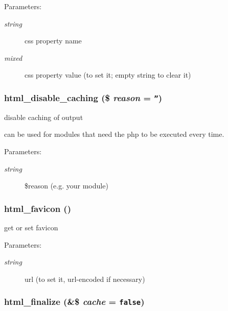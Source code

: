 \begin{Desc}
\item[Parameters:]
\begin{description}
\item[{\em string}]css property name \item[{\em mixed}]css property value (to set it; empty string to clear it) \end{description}
\end{Desc}
\hypertarget{html_8inc_8php_b0dafe79ee61164014b0a4d8b4112dbb}{
\subsubsection[{html\_\-disable\_\-caching}]{\setlength{\rightskip}{0pt plus 5cm}html\_\-disable\_\-caching (\$ {\em reason} = {\tt ''})}}
\label{html_8inc_8php_b0dafe79ee61164014b0a4d8b4112dbb}


disable caching of output

can be used for modules that need the php to be executed every time. \begin{Desc}
\item[Parameters:]
\begin{description}
\item[{\em string}]\$reason (e.g. your module) \end{description}
\end{Desc}
\hypertarget{html_8inc_8php_5738adf9b56d1ff2b8d02977ed7929ce}{
\subsubsection[{html\_\-favicon}]{\setlength{\rightskip}{0pt plus 5cm}html\_\-favicon ()}}
\label{html_8inc_8php_5738adf9b56d1ff2b8d02977ed7929ce}


get or set favicon

\begin{Desc}
\item[Parameters:]
\begin{description}
\item[{\em string}]url (to set it, url-encoded if necessary) \end{description}
\end{Desc}
\hypertarget{html_8inc_8php_405dc7e3718d4196c05087057ebf69bf}{
\subsubsection[{html\_\-finalize}]{\setlength{\rightskip}{0pt plus 5cm}html\_\-finalize (\&\$ {\em cache} = {\tt false})}}
\label{html_8inc_8php_405dc7e3718d4196c05087057ebf69bf}


